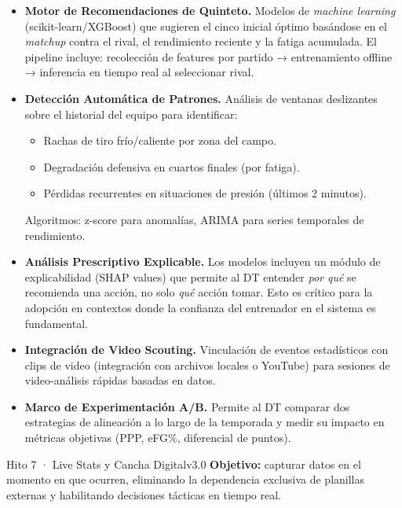 \documentclass[11pt,a4paper]{article}
\begin{document}
\begin{itemize}
  \item \textbf{Motor de Recomendaciones de Quinteto.} Modelos de \textit{machine learning} (scikit-learn/XGBoost) que sugieren el cinco inicial óptimo basándose en el \textit{matchup} contra el rival, el rendimiento reciente y la fatiga acumulada. El pipeline incluye: recolección de features por partido → entrenamiento offline → inferencia en tiempo real al seleccionar rival.

  \item \textbf{Detección Automática de Patrones.} Análisis de ventanas deslizantes sobre el historial del equipo para identificar:
  \begin{itemize}[nosep]
    \item Rachas de tiro frío/caliente por zona del campo.
    \item Degradación defensiva en cuartos finales (por fatiga).
    \item Pérdidas recurrentes en situaciones de presión (últimos 2 minutos).
  \end{itemize}
  Algoritmos: z-score para anomalías, ARIMA para series temporales de rendimiento.

  \item \textbf{Análisis Prescriptivo Explicable.} Los modelos incluyen un módulo de explicabilidad (SHAP values) que permite al DT entender \textit{por qué} se recomienda una acción, no solo \textit{qué} acción tomar. Esto es crítico para la adopción en contextos donde la confianza del entrenador en el sistema es fundamental.

  \item \textbf{Integración de Video Scouting.} Vinculación de eventos estadísticos con clips de video (integración con archivos locales o YouTube) para sesiones de video-análisis rápidas basadas en datos.

  \item \textbf{Marco de Experimentación A/B.} Permite al DT comparar dos estrategias de alineación a lo largo de la temporada y medir su impacto en métricas objetivas (PPP, eFG\%, diferencial de puntos).
\end{itemize}

\begin{roadbox}{Hito 7 · Live Stats y Cancha Digital}{v3.0}
\small\textcolor{accentlight}{%
  \textbf{Objetivo:} capturar datos en el momento en que ocurren, eliminando la dependencia exclusiva de planillas externas y habilitando decisiones tácticas en tiempo real.
}
\end{roadbox}
\end{document}
